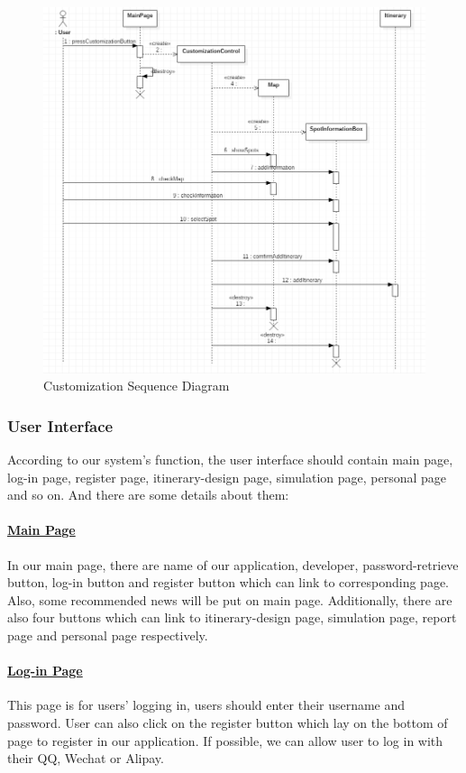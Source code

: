 \documentclass[10pt]{article}
\begin{document}
\begin{figure}[H]
	\centering
	\includegraphics[width=14cm]{customization.png} 
	\caption{Customization Sequence Diagram}
	\label{Customization Sequence Diagram}
\end{figure}

\subsubsection{User Interface} 
According to our system’s function, the user interface should contain main page, log-in page, register page, itinerary-design page, simulation page, personal page and so on. And there are some details about them:

\paragraph{\underline{Main Page}}
In our main page, there are name of our application, developer, password-retrieve button, log-in button and register button which can link to corresponding page. Also, some recommended news will be put on main page. Additionally, there are also four buttons which can link to itinerary-design page, simulation page, report page and personal page respectively.

\paragraph{\underline{Log-in Page}}
This page is for users’ logging in, users should enter their username and password. User can also click on the register button which lay on the bottom of page to register in our application. If possible, we can allow user to log in with their QQ, Wechat or Alipay.
\end{document}
